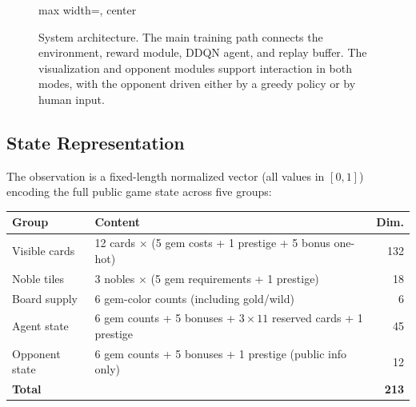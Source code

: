 \documentclass[11pt]{article}
\begin{document}
\begin{figure}[H]
\begin{adjustbox}{max width=\linewidth, center}
  \end{adjustbox}
  \caption{System architecture. The main training path connects the environment,
  reward module, DDQN agent, and replay buffer. The visualization and opponent
  modules support interaction in both modes, with the opponent driven either by
  a greedy policy or by human input.}
  \label{fig:system}
\end{figure}

\subsection{State Representation}
The observation is a fixed-length normalized vector (all values in $[0,1]$) encoding the full
public game state across five groups:

\begin{center}
\renewcommand{\arraystretch}{1.15}
\begin{tabular}{lp{7.5cm}r}
\toprule
\textbf{Group} & \textbf{Content} & \textbf{Dim.} \\
\midrule
Visible cards  & 12 cards $\times$ (5 gem costs + 1 prestige + 5 bonus one-hot) & 132 \\
Noble tiles    & 3 nobles $\times$ (5 gem requirements + 1 prestige)             & 18  \\
Board supply   & 6 gem-color counts (including gold/wild)                        & 6   \\
Agent state    & 6 gem counts + 5 bonuses + $3\times11$ reserved cards + 1 prestige & 45 \\
Opponent state & 6 gem counts + 5 bonuses + 1 prestige (public info only)       & 12  \\
\midrule
\textbf{Total} & & \textbf{213} \\
\bottomrule
\end{tabular}
\end{center}
\end{document}
